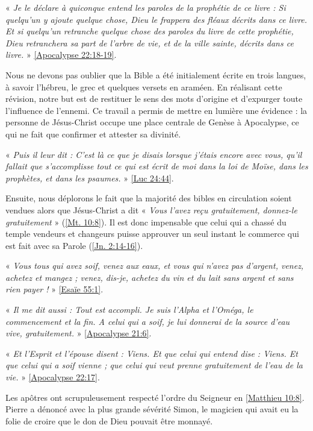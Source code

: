 \begin{small}
« \emph{Je le déclare à quiconque entend les paroles de la prophétie de ce livre : Si quelqu'un y ajoute quelque chose, Dieu le frappera des fléaux décrits dans ce livre. Et si quelqu'un retranche quelque chose des paroles du livre de cette prophétie, Dieu retranchera sa part de l'arbre de vie, et de la ville sainte, décrits dans ce livre.} » \vref{Apocalypse 22:18-19}.

Nous ne devons pas oublier que la Bible a été initialement écrite en trois langues, à savoir l'hébreu, le grec et quelques versets en araméen. En réalisant cette révision, notre but est de restituer le sens des mots d'origine et d'expurger toute l'influence de l'ennemi. Ce travail a permis de mettre en lumière une évidence : la personne de Jésus-Christ occupe une place centrale de Genèse à Apocalypse, ce qui ne fait que confirmer et attester sa divinité.

« \emph{Puis il leur dit : C'est là ce que je disais lorsque j'étais encore avec vous, qu'il fallait que s'accomplisse tout ce qui est écrit de moi dans la loi de Moïse, dans les prophètes, et dans les psaumes.} » \vref{Luc 24:44}.

Ensuite, nous déplorons le fait que la majorité des bibles en circulation soient vendues alors que Jésus-Christ a dit « \emph{Vous l'avez reçu gratuitement, donnez-le gratuitement} » (\vref{Mt. 10:8}). Il est donc impensable que celui qui a chassé du temple vendeurs et changeurs puisse approuver un seul instant le commerce qui est fait avec sa Parole (\vref{Jn. 2:14-16}).

« \emph{Vous tous qui avez soif, venez aux eaux, et vous qui n'avez pas d'argent, venez, achetez et mangez ; venez, dis-je, achetez du vin et du lait sans argent et sans rien payer !} » \vref{Esaïe 55:1}.

« \emph{Il me dit aussi : Tout est accompli. Je suis l'Alpha et l'Oméga, le commencement et la fin. A celui qui a soif, je lui donnerai de la source d'eau vive, gratuitement.} » \vref{Apocalypse 21:6}.

« \emph{Et l'Esprit et l'épouse disent : Viens. Et que celui qui entend dise : Viens. Et que celui qui a soif vienne ; que celui qui veut prenne gratuitement de l'eau de la vie.} » \vref{Apocalypse 22:17}.

Les apôtres ont scrupuleusement respecté l'ordre du Seigneur en \vref{Matthieu 10:8}. Pierre a dénoncé avec la plus grande sévérité Simon, le magicien qui avait eu la folie de croire que le don de Dieu pouvait être monnayé. 


\end{small}
